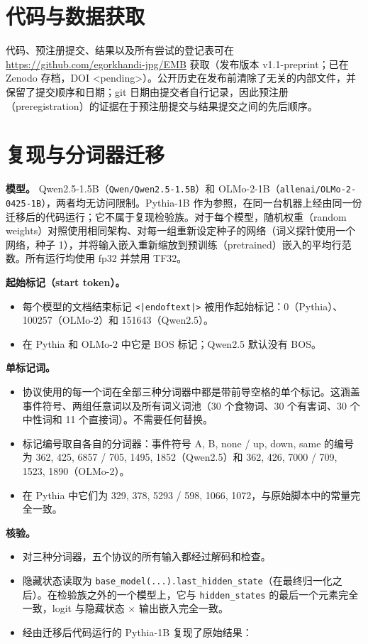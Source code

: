 \documentclass[UTF8,fontset=none,a4paper]{ctexart}
\begin{document}
\section*{代码与数据获取}
代码、预注册提交、结果以及所有尝试的登记表可在 \url{https://github.com/egorkhandi-jpg/EMB} 获取（发布版本 \mbox{v1.1-preprint}；已在 Zenodo 存档，DOI \mbox{<pending>}）。公开历史在发布前清除了无关的内部文件，并保留了提交顺序和日期；git 日期由提交者自行记录，因此预注册（preregistration）的证据在于预注册提交与结果提交之间的先后顺序。



\appendix
\section{复现与分词器迁移}

\textbf{模型。} \mbox{Qwen2.5-1.5B}（\texttt{Qwen/Qwen2.5-1.5B}）和 \mbox{OLMo-2-1B}（\texttt{allenai/OLMo-2-0425-1B}），两者均无访问限制。\mbox{Pythia-1B} 作为参照，在同一台机器上经由同一份迁移后的代码运行；它不属于复现检验族。对于每个模型，随机权重（random weights）对照使用相同架构、对每一组重新设定种子的网络（词义探针使用一个网络，种子 1），并将输入嵌入重新缩放到预训练（pretrained）嵌入的平均行范数。所有运行均使用 fp32 并禁用 TF32。

\textbf{起始标记（start token）。}
\begin{itemize}
\item 每个模型的文档结束标记 \texttt{<|endoftext|>} 被用作起始标记：0（Pythia）、100257（\mbox{OLMo-2}）和 151643（Qwen2.5）。
\item 在 Pythia 和 \mbox{OLMo-2} 中它是 BOS 标记；Qwen2.5 默认没有 BOS。
\end{itemize}

\textbf{单标记词。}
\begin{itemize}
\item 协议使用的每一个词在全部三种分词器中都是带前导空格的单个标记。这涵盖事件符号、两组任意词以及所有词义词池（30 个食物词、30 个有害词、30 个中性词和 11 个直接词）。不需要任何替换。
\item 标记编号取自各自的分词器：事件符号 A, B, none / up, down, same 的编号为 362, 425, 6857 / 705, 1495, 1852（Qwen2.5）和 362, 426, 7000 / 709, 1523, 1890（\mbox{OLMo-2}）。
\item 在 Pythia 中它们为 329, 378, 5293 / 598, 1066, 1072，与原始脚本中的常量完全一致。
\end{itemize}

\textbf{核验。}
\begin{itemize}
\item 对三种分词器，五个协议的所有输入都经过解码和检查。
\item 隐藏状态读取为 \texttt{base\_model(...).last\_hidden\_state}（在最终归一化之后）。在检验族之外的一个模型上，它与 \texttt{hidden\_states} 的最后一个元素完全一致，logit 与隐藏状态 $\times$ 输出嵌入完全一致。
\item 经由迁移后代码运行的 \mbox{Pythia-1B} 复现了原始结果：
\end{itemize}
\end{document}
